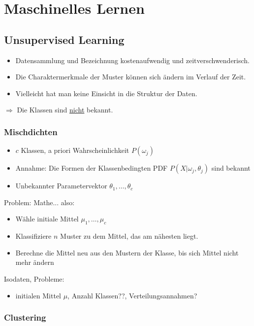 
\chapter{Maschinelles Lernen}

\section{Unsupervised Learning}

\begin{itemize}
\item Datensammlung und Bezeichnung kostenaufwendig und zeitverschwenderisch.
\item Die Charaktermerkmale der Muster können sich ändern im Verlauf der Zeit.
\item Vielleicht hat man keine Einsicht in die Struktur der Daten.
\end{itemize}
$\Rightarrow$ Die Klassen sind \underline{nicht} bekannt.

\subsection{Mischdichten}

\begin{itemize}
\item $c$ Klassen, a priori Wahrscheinlichkeit $P(\omega_j)$
\item Annahme: Die Formen der Klassenbedingten PDF $P(X | \omega_j , \theta_j)$ sind bekannt
\item Unbekannter Parametervektor $\theta_1, \dots, \theta_c$
\end{itemize}
Problem: Mathe... also:
\begin{itemize}
\item Wähle initiale Mittel $\mu_1, \dots, \mu_c$
\item Klassifiziere $n$ Muster zu dem Mittel, das am nähesten liegt.
\item Berechne die Mittel neu aus den Mustern der Klasse, bis sich Mittel nicht mehr ändern
\end{itemize}
Isodaten, Probleme:
\begin{itemize}
\item initialen Mittel $\mu$, Anzahl Klassen??, Verteilungsannahmen?
\end{itemize}

\subsection{Clustering}

